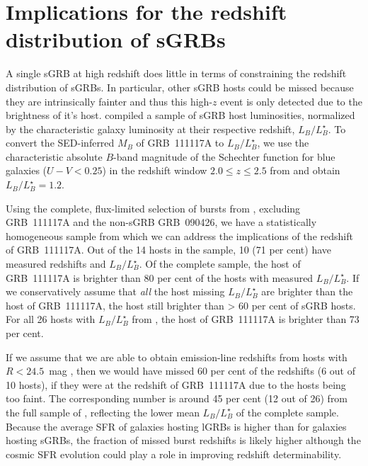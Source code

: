 \documentclass{aa}    %
\begin{document}


\section{Implications for the redshift distribution of sGRBs}


A single sGRB at high redshift does little in terms of constraining the redshift
distribution of sGRBs. In particular, other sGRB hosts could be missed because
they are intrinsically fainter and thus this high-$z$ event is only detected due
to the brightness of it's host. \citet{Berger2014} compiled a sample of sGRB
host luminosities, normalized by the characteristic galaxy luminosity at their
respective redshift, $L_B/L^{\star}_{B}$. To convert the SED-inferred $M_B$ of
GRB~111117A to $L_B/L^{\star}_{B}$, we use the characteristic absolute $B$-band
magnitude of the Schechter function for blue galaxies ($U - V < 0.25$) in the
redshift window $2.0 \leq z \leq 2.5$ from \citet{Marchesini2007} and obtain
$L_B/L^{\star}_{B} = 1.2$. 

Using the complete, flux-limited selection of bursts from \citet{DAvanzo2014a},
excluding GRB~111117A and the non-sGRB GRB~090426, we have a statistically
homogeneous sample from which we can address the implications of the redshift of
GRB~111117A. Out of the 14 hosts in the sample, 10 (71 per cent) have measured
redshifts and $L_B/L^{\star}_{B}$. Of the complete sample, the host of
GRB~111117A  is brighter than 80 per cent of the hosts with measured
$L_B/L^{\star}_{B}$. If we conservatively assume that \textit{all} the host
missing $L_B/L^{\star}_{B}$ are brighter than the host of GRB~111117A, the host
still brighter than > 60 per cent of sGRB hosts. For all 26 hosts with
$L_B/L^{\star}_{B}$ from \citet{Berger2014}, the host of GRB~111117A is brighter
than 73 per cent.

If we assume that we are able to obtain emission-line redshifts from hosts with
$R < 24.5$~mag \citep{Kruhler2012}, then we would have missed 60 per cent
of the redshifts (6 out of 10 hosts), if they were at the redshift of
GRB~111117A due to the hosts being too faint. The corresponding number is around
45 per cent (12 out of 26) from the full sample of \citet{Berger2014}, reflecting
the lower mean $L_B/L^{\star}_{B}$ of the complete sample. Because the average
SFR of galaxies hosting lGRBs is higher than for galaxies hosting sGRBs, the
fraction of missed burst redshifts is likely higher although the cosmic SFR
evolution could play a role in improving redshift determinability. 
\end{document}
